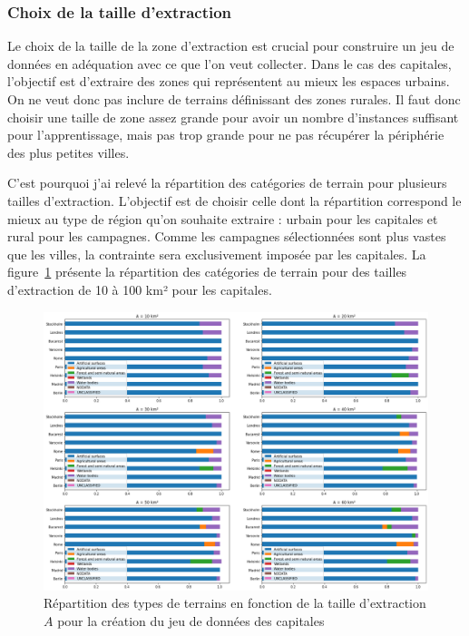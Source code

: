 \subsubsection{Choix de la taille d'extraction}

Le choix de la taille de la zone d'extraction est crucial pour construire un jeu de données en adéquation avec ce que l'on veut collecter.
Dans le cas des capitales, l'objectif est d'extraire des zones qui représentent au mieux les espaces urbains.
On ne veut donc pas inclure de terrains définissant des zones rurales.
Il faut donc choisir une taille de zone assez grande pour avoir un nombre d'instances suffisant pour l'apprentissage, mais pas trop grande pour ne pas récupérer la périphérie des plus petites villes.

C'est pourquoi j'ai relevé la répartition des catégories de terrain pour plusieurs tailles d'extraction.
L'objectif est de choisir celle dont la répartition correspond le mieux au type de région qu'on souhaite extraire : urbain pour les capitales et rural pour les campagnes.
Comme les campagnes sélectionnées sont plus vastes que les villes, la contrainte sera exclusivement imposée par les capitales.
La figure~\ref{fig:taille-extraction} présente la répartition des catégories de terrain pour des tailles d'extraction de 10 à 100 km² pour les capitales.


\begin{figure}[!h]
    \centering
    \includegraphics[width=\textwidth]{figures/taille-extraction}
    \caption{Répartition des types de terrains en fonction de la taille d'extraction $A$ pour la création du jeu de données des capitales}
    \label{fig:taille-extraction}
\end{figure}




